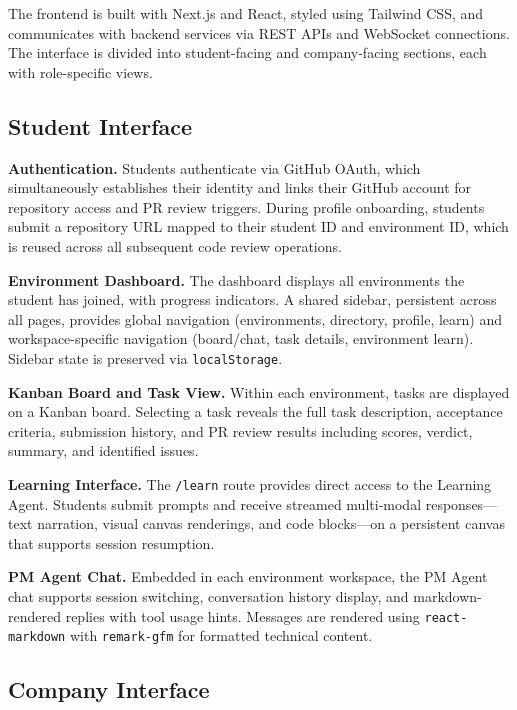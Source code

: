 \documentclass[runningheads]{llncs}
\begin{document}
The frontend is built with Next.js and React, styled using Tailwind CSS, and communicates with backend services via REST APIs and WebSocket connections. The interface is divided into student-facing and company-facing sections, each with role-specific views.

\subsection{Student Interface}

\noindent\textbf{Authentication.} Students authenticate via GitHub OAuth, which simultaneously establishes their identity and links their GitHub account for repository access and PR review triggers. During profile onboarding, students submit a repository URL mapped to their student ID and environment ID, which is reused across all subsequent code review operations.

\noindent\textbf{Environment Dashboard.} The dashboard displays all environments the student has joined, with progress indicators. A shared sidebar, persistent across all pages, provides global navigation (environments, directory, profile, learn) and workspace-specific navigation (board/chat, task details, environment learn). Sidebar state is preserved via \texttt{localStorage}.

\noindent\textbf{Kanban Board and Task View.} Within each environment, tasks are displayed on a Kanban board. Selecting a task reveals the full task description, acceptance criteria, submission history, and PR review results including scores, verdict, summary, and identified issues.

\noindent\textbf{Learning Interface.} The \texttt{/learn} route provides direct access to the Learning Agent. Students submit prompts and receive streamed multi-modal responses---text narration, visual canvas renderings, and code blocks---on a persistent canvas that supports session resumption.

\noindent\textbf{PM Agent Chat.} Embedded in each environment workspace, the PM Agent chat supports session switching, conversation history display, and markdown-rendered replies with tool usage hints. Messages are rendered using \texttt{react-markdown} with \texttt{remark-gfm} for formatted technical content.

\subsection{Company Interface}
\end{document}
